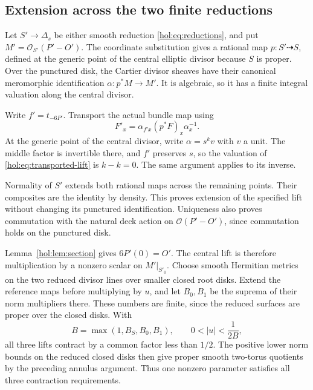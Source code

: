 \documentclass[11pt]{article}
\numberwithin{equation}{section}
\begin{document}
\subsection{Extension across the two finite reductions}

Let $S'\to\Delta_s$ be either smooth reduction
\eqref{hol:eq:reductions}, and put $M'=\mathcal O_{S'}(P'-O')$.
The coordinate substitution gives a rational map
$p:S'\dashrightarrow S$, defined at the generic point of the
central elliptic divisor because $S$ is proper. Over the punctured
disk, the Cartier divisor sheaves have their canonical meromorphic
identification $\alpha:p^*M\to M'$. It is algebraic, so it has a
finite integral valuation along the central divisor.

Write $f'=t_{-6P'}$. Transport the actual bundle map using
\begin{equation}\label{hol:eq:transported-lift}
 F'_x=\alpha_{f'x}(p^*F)_x\alpha_x^{-1}.
\end{equation}
At the generic point of the central divisor, write $\alpha=s^k v$
with $v$ a unit. The middle factor is invertible there, and $f'$
preserves $s$, so the valuation of \eqref{hol:eq:transported-lift}
is $k-k=0$. The same argument applies to its inverse.

Normality of
$S'$ extends both rational maps across the remaining points. Their
composites are the identity by density. This proves extension of the
specified lift without changing its punctured identification.
Uniqueness also proves commutation with the natural deck action on
$\mathcal O(P'-O')$, since commutation holds on the punctured disk.

Lemma~\ref{hol:lem:section} gives $6P'(0)=O'$. The central lift is
therefore multiplication by a nonzero scalar on $M'|_{S'_0}$.
Choose smooth Hermitian metrics on the two reduced divisor lines
over smaller closed root disks. Extend the reference maps before
multiplying by $u$, and let $B_0,B_1$ be the suprema of their norm
multipliers there. These numbers are finite, since the reduced
surfaces are proper over the closed disks. With
\begin{equation}\label{hol:eq:common-bound}
 B=\max(1,B_S,B_0,B_1),\qquad 0<|u|<\frac1{2B},
\end{equation}
all three lifts contract by a common factor less than $1/2$.
The positive lower norm bounds on the reduced closed disks then
give proper smooth two-torus quotients by the preceding annulus
argument. Thus one nonzero parameter satisfies all three
contraction requirements.
\end{document}
